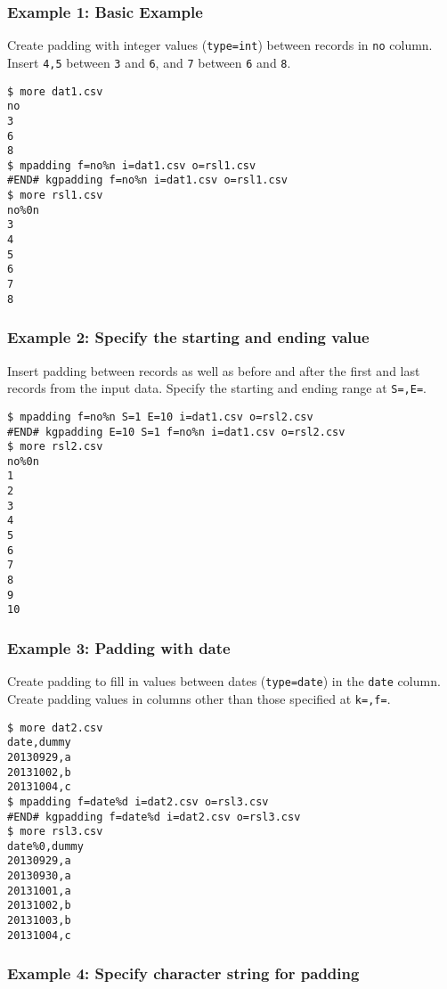 \subsubsection*{Example 1: Basic Example}

Create padding with integer values (\verb|type=int|) between records in \verb|no| column.
Insert \verb|4,5| between \verb|3| and \verb|6|, and \verb|7| between \verb|6| and \verb|8|.


\begin{Verbatim}[baselinestretch=0.7,frame=single]
$ more dat1.csv
no
3
6
8
$ mpadding f=no%n i=dat1.csv o=rsl1.csv
#END# kgpadding f=no%n i=dat1.csv o=rsl1.csv
$ more rsl1.csv
no%0n
3
4
5
6
7
8
\end{Verbatim}
\subsubsection*{Example 2: Specify the starting and ending value}

Insert padding between records as well as before and after the first and last records from the input data.
Specify the starting and ending range at \verb|S=,E=|.


\begin{Verbatim}[baselinestretch=0.7,frame=single]
$ mpadding f=no%n S=1 E=10 i=dat1.csv o=rsl2.csv
#END# kgpadding E=10 S=1 f=no%n i=dat1.csv o=rsl2.csv
$ more rsl2.csv
no%0n
1
2
3
4
5
6
7
8
9
10
\end{Verbatim}
\subsubsection*{Example 3: Padding with date}

Create padding to fill in values between dates (\verb|type=date|) in the \verb|date| column.
Create padding values in columns other than those specified at \verb|k=,f=|.


\begin{Verbatim}[baselinestretch=0.7,frame=single]
$ more dat2.csv
date,dummy
20130929,a
20131002,b
20131004,c
$ mpadding f=date%d i=dat2.csv o=rsl3.csv
#END# kgpadding f=date%d i=dat2.csv o=rsl3.csv
$ more rsl3.csv
date%0,dummy
20130929,a
20130930,a
20131001,a
20131002,b
20131003,b
20131004,c
\end{Verbatim}
\subsubsection*{Example 4: Specify character string for padding}

